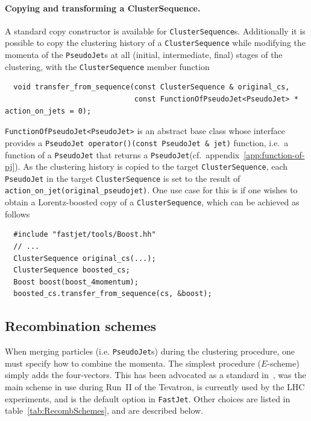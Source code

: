 \documentclass[12pt,a4]{article}
\newcommand{\fastjet}{\texttt{FastJet}\xspace}
\newcommand{\ttt}[1]{{\small\texttt{#1}}}
\newcommand{\PJ}{\ttt{PseudoJet}\xspace}
\newcommand{\CS}{\ttt{ClusterSequence}\xspace}
\begin{document}
\paragraph{Copying and transforming a ClusterSequence.}
%
A standard copy constructor is available for {\CS}s. 
%
Additionally it is possible to copy the clustering history of a \CS
while modifying the momenta of the \ttt{PseudoJet}s at all (initial,
intermediate, final) stages of the clustering, with the \CS member
function
\begin{lstlisting}
  void transfer_from_sequence(const ClusterSequence & original_cs, 
                              const FunctionOfPseudoJet<PseudoJet> * action_on_jets = 0);
\end{lstlisting}
\ttt{FunctionOfPseudoJet<PseudoJet>} is an abstract base class whose
interface provides a \ttt{PseudoJet operator()(const PseudoJet \& jet)}
function, i.e.\ a function of a \PJ that returns a \PJ (cf.\ 
appendix~\ref{app:function-of-pj}).
%
As the clustering history is copied to the target \CS, each \PJ in the
target \CS is set to the result of
\ttt{action\_on\_jet(original\_pseudojet)}. 
%
One use case for this is if one wishes to obtain a Lorentz-boosted
copy of a \CS, which can be achieved as follows
\begin{lstlisting}
  #include "fastjet/tools/Boost.hh"
  // ...
  ClusterSequence original_cs(...);
  ClusterSequence boosted_cs;
  Boost boost(boost_4momentum);
  boosted_cs.transfer_from_sequence(cs, &boost);
\end{lstlisting}

\subsection{Recombination schemes}
\label{sec:recomb_schemes}


%

When merging particles (i.e. \ttt{PseudoJet}s) during 
the clustering procedure, one must
specify how to combine the momenta. The simplest procedure
($E$-scheme) simply adds the four-vectors. 
%
This has been advocated as a standard in~\cite{RunII-jet-physics}, was
the main scheme in use during Run~II of the Tevatron, is currently
used by the LHC experiments, and is the default option in \fastjet.
%
Other choices are listed in
table~\ref{tab:RecombSchemes}, and are described below.
\end{document}
